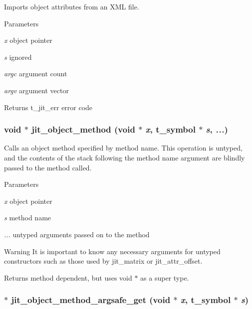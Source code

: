 Imports object attributes from an XML file. 
\begin{DoxyParams}{Parameters}
\item[{\em x}]object pointer \item[{\em s}]ignored \item[{\em argc}]argument count \item[{\em argv}]argument vector\end{DoxyParams}
\begin{DoxyReturn}{Returns}
t\_\-jit\_\-err error code 
\end{DoxyReturn}
\hypertarget{group__objectmod_ga9e1b9b8ed4fce611de26a74c6e1452c8}{
\subsubsection[{jit\_\-object\_\-method}]{\setlength{\rightskip}{0pt plus 5cm}void $\ast$ jit\_\-object\_\-method (void $\ast$ {\em x}, \/  {\bf t\_\-symbol} $\ast$ {\em s}, \/   {\em ...})}}
\label{group__objectmod_ga9e1b9b8ed4fce611de26a74c6e1452c8}


Calls an object method specified by method name. This operation is untyped, and the contents of the stack following the method name argument are blindly passed to the method called.


\begin{DoxyParams}{Parameters}
\item[{\em x}]object pointer \item[{\em s}]method name \item[{\em ...}]untyped arguments passed on to the method \end{DoxyParams}
\begin{DoxyWarning}{Warning}
It is important to know any necessary arguments for untyped constructors such as those used by jit\_\-matrix or jit\_\-attr\_\-offset.
\end{DoxyWarning}
\begin{DoxyReturn}{Returns}
method dependent, but uses void $\ast$ as a super type. 
\end{DoxyReturn}
\hypertarget{group__objectmod_gacbb8c55e2c6c564d6018b8550cf7f98f}{
\subsubsection[{jit\_\-object\_\-method\_\-argsafe\_\-get}]{$\ast$ jit\_\-object\_\-method\_\-argsafe\_\-get (void $\ast$ {\em x}, \/  {\bf t\_\-symbol} $\ast$ {\em s})}}
\label{group__objectmod_gacbb8c55e2c6c564d6018b8550cf7f98f}


